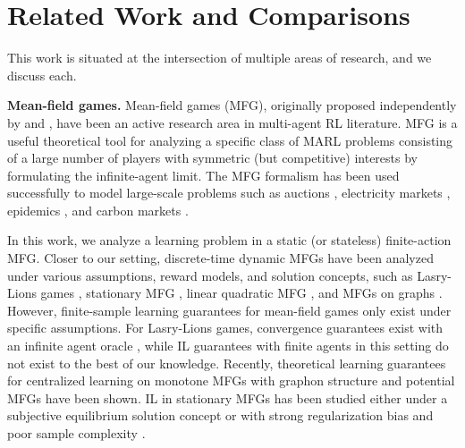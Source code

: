 \section{Related Work and Comparisons}
This work is situated at the intersection of multiple areas of research, and we discuss each.

\textbf{Mean-field games.}
Mean-field games (MFG), originally proposed independently by \citet{lasry2007mean} and \citet{huang2006large}, have been an active research area in multi-agent RL literature.
MFG is a useful theoretical tool for analyzing a specific class of MARL problems consisting of a large number of players with symmetric (but competitive) interests by formulating the infinite-agent limit.
The MFG formalism has been used successfully to model large-scale problems such as
auctions \citep{pinasco2023learning},
electricity markets \citep{gomes2021mean},
epidemics \citep{aurell2022finite, huang2022game}, 
and carbon markets \citep{carmona2022mean}.


In this work, we analyze a learning problem in a static (or stateless) finite-action MFG.
Closer to our setting, discrete-time dynamic MFGs have been analyzed under various assumptions, reward models, and solution concepts, such as Lasry-Lions games \citep{perrin2020fictitious,perolat2022scaling}, stationary MFG \citep{anahtarci2022q,xie2021learning,zaman2023oracle, yardim2023policy}, linear quadratic MFG \citep{guo2022entropy, fu2019actor}, and MFGs on graphs \citep{yang2017learning,gu2021mean}.
However, finite-sample learning guarantees for mean-field games only exist under specific assumptions.
For Lasry-Lions games, convergence guarantees exist with an infinite agent oracle \citep{perrin2020fictitious, zhang2024learning}, while IL guarantees with finite agents in this setting do not exist to the best of our knowledge.
Recently, theoretical learning guarantees for centralized learning on monotone MFGs with graphon structure \citep{zhang2024learning} and potential MFGs \citep{geist2021concave} have been shown.
IL in stationary MFGs has been studied either under a subjective equilibrium solution concept \citep{yongacoglu2022independent} or with strong regularization bias and  poor sample complexity \citep{yardim2023policy}.

